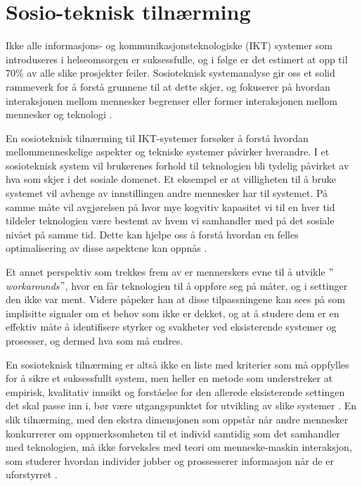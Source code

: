 \section{Sosio-teknisk tilnærming}
\label{section:sosioteknisk}

Ikke alle informasjons- og kommunikasjonsteknologiske (IKT) systemer som introduseres i helseomsorgen er suksessfulle, og i følge \citet{FITT} er det estimert at opp til 70\% av alle slike prosjekter feiler.
Sosioteknisk systemanalyse gir oss et solid rammeverk for å forstå grunnene til at dette skjer, og fokuserer på hvordan interaksjonen mellom mennesker begrenser eller former interaksjonen mellom mennesker og teknologi \citep{Coiera07}. 

\noindent
En sosioteknisk tilnærming til IKT-systemer forsøker å forstå hvordan mellommenneskelige aspekter og  tekniske systemer påvirker hverandre. I et sosioteknisk system vil brukerenes forhold til teknologien bli tydelig påvirket av hva som skjer i det sosiale domenet. Et eksempel er at villigheten til å bruke systemet vil avhenge av innstillingen andre mennesker har til systemet. På samme måte vil avgjørelsen på hvor mye kogvitiv kapasitet vi til en hver tid tildeler teknologien være bestemt av hvem vi samhandler med på det sosiale nivået på samme tid. Dette kan hjelpe oss å forstå hvordan en felles optimalisering av disse aspektene kan oppnås \citep{Coiera07}.

\noindent
Et annet perspektiv som trekkes frem av \citet{Coiera07} er mennerskers evne til å utvikle \emph{$"$workarounds$"$}, hvor en får teknologien til å oppføre seg på måter, og i settinger den ikke var ment. Videre påpeker han at disse tilpassningene kan sees på som  implisitte signaler om et behov som ikke er dekket, og at å studere dem er en effektiv måte å identifisere styrker og svakheter ved eksisterende systemer og prosesser, og dermed hva som må endres. 

\noindent
En sosioteknisk tilnærming er altså ikke en liste med kriterier som må oppfylles for å sikre et suksessfullt system, men heller en metode som understreker at empirisk, kvalitativ innsikt og forståelse for den allerede eksisterende settingen det skal passe inn i, bør være utgangspunktet for utvikling av slike systemer \citep{Berg99}. En slik tilnærming, med den ekstra dimensjonen som oppstår når andre mennesker konkurrerer om oppmerksomheten til et individ samtidig som det samhandler med teknologien, må ikke forveksles med teori om menneske-maskin interaksjon, som studerer hvordan individer jobber og prossesserer informasjon når de er uforstyrret \citep{Coiera07}.

